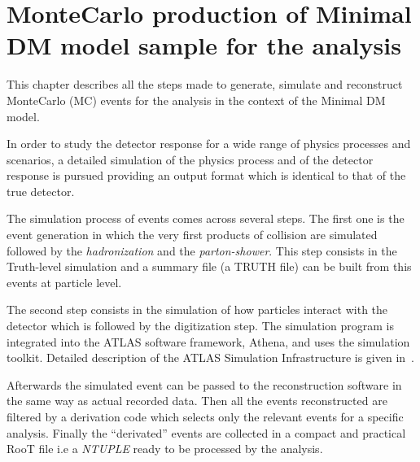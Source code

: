 \chapter[MonteCarlo sample production]{MonteCarlo production of Minimal DM model sample for the \mph analysis}

\lettrine{T}{}his chapter describes all the steps made to generate, simulate and reconstruct MonteCarlo (MC) events for the \mph analysis in the context of the Minimal DM model.



In order to study the detector response for a wide range of physics processes and scenarios, a detailed simulation  of the physics process and of the detector response is pursued providing an output format which is identical to that of the true detector. 

The simulation process of events comes across several steps. The first one is the event generation in which the very first products of \pp collision are simulated followed by the \emph{hadronization} and the \emph{parton-shower}. This step consists in the Truth-level simulation and a summary file (a TRUTH file) can be built from this events at particle level.

The second step consists in the simulation of how particles interact with the detector which is followed by the digitization step. The simulation program is integrated into the ATLAS software framework, Athena, and uses the \geant \cite{geant4} simulation toolkit. Detailed description of the ATLAS Simulation Infrastructure is given in~\cite{simulation}.

Afterwards the simulated event can be passed to the reconstruction software in the same way as actual recorded data. Then all the events reconstructed are filtered by a derivation code which selects only the  relevant events for a specific analysis. Finally the ``derivated'' events are collected in a compact and practical RooT file i.e a \emph{NTUPLE} ready to be processed by the analysis.

